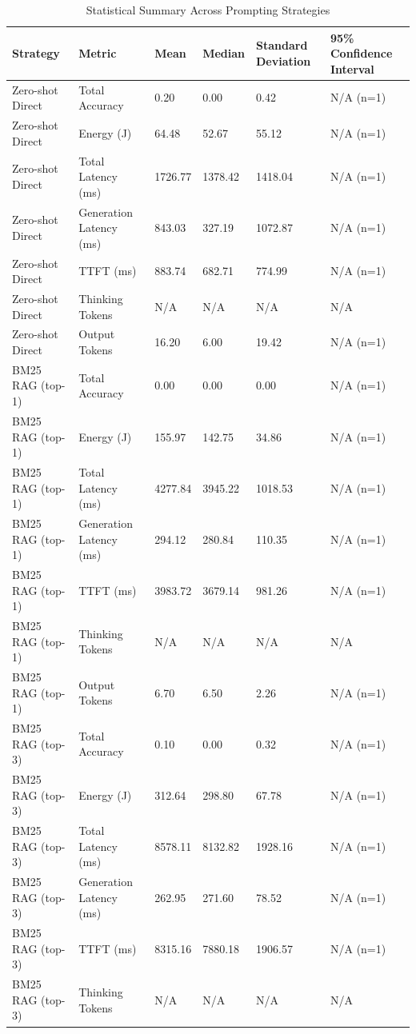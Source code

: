\begin{table}
\caption{Statistical Summary Across Prompting Strategies}
\label{tab:statistical_summary}
\begin{tabular}{llllll}
\toprule
Strategy & Metric & Mean & Median & Standard Deviation & 95\% Confidence Interval \\
\midrule
Zero-shot Direct & Total Accuracy & 0.20 & 0.00 & 0.42 & N/A (n=1) \\
Zero-shot Direct & Energy (J) & 64.48 & 52.67 & 55.12 & N/A (n=1) \\
Zero-shot Direct & Total Latency (ms) & 1726.77 & 1378.42 & 1418.04 & N/A (n=1) \\
Zero-shot Direct & Generation Latency (ms) & 843.03 & 327.19 & 1072.87 & N/A (n=1) \\
Zero-shot Direct & TTFT (ms) & 883.74 & 682.71 & 774.99 & N/A (n=1) \\
Zero-shot Direct & Thinking Tokens & N/A & N/A & N/A & N/A \\
Zero-shot Direct & Output Tokens & 16.20 & 6.00 & 19.42 & N/A (n=1) \\
BM25 RAG (top-1) & Total Accuracy & 0.00 & 0.00 & 0.00 & N/A (n=1) \\
BM25 RAG (top-1) & Energy (J) & 155.97 & 142.75 & 34.86 & N/A (n=1) \\
BM25 RAG (top-1) & Total Latency (ms) & 4277.84 & 3945.22 & 1018.53 & N/A (n=1) \\
BM25 RAG (top-1) & Generation Latency (ms) & 294.12 & 280.84 & 110.35 & N/A (n=1) \\
BM25 RAG (top-1) & TTFT (ms) & 3983.72 & 3679.14 & 981.26 & N/A (n=1) \\
BM25 RAG (top-1) & Thinking Tokens & N/A & N/A & N/A & N/A \\
BM25 RAG (top-1) & Output Tokens & 6.70 & 6.50 & 2.26 & N/A (n=1) \\
BM25 RAG (top-3) & Total Accuracy & 0.10 & 0.00 & 0.32 & N/A (n=1) \\
BM25 RAG (top-3) & Energy (J) & 312.64 & 298.80 & 67.78 & N/A (n=1) \\
BM25 RAG (top-3) & Total Latency (ms) & 8578.11 & 8132.82 & 1928.16 & N/A (n=1) \\
BM25 RAG (top-3) & Generation Latency (ms) & 262.95 & 271.60 & 78.52 & N/A (n=1) \\
BM25 RAG (top-3) & TTFT (ms) & 8315.16 & 7880.18 & 1906.57 & N/A (n=1) \\
BM25 RAG (top-3) & Thinking Tokens & N/A & N/A & N/A & N/A \\

\end{tabular}
\end{table}
